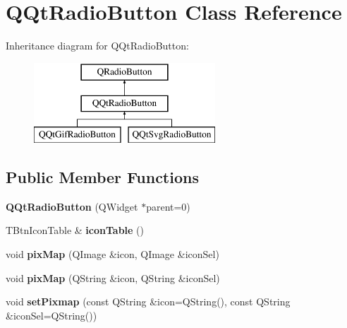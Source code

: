 \hypertarget{class_q_qt_radio_button}{}\section{Q\+Qt\+Radio\+Button Class Reference}
\label{class_q_qt_radio_button}
Inheritance diagram for Q\+Qt\+Radio\+Button\+:\begin{figure}[H]
\begin{center}
\leavevmode
\includegraphics[height=3.000000cm]{class_q_qt_radio_button}
\end{center}
\end{figure}
\subsection*{Public Member Functions}
\begin{DoxyCompactItemize}
\item 
\mbox{\label{class_q_qt_radio_button_aa656d8297746a66e5c9942bbc369e285}} 
{\bfseries Q\+Qt\+Radio\+Button} (Q\+Widget $\ast$parent=0)
\item 
\mbox{\label{class_q_qt_radio_button_a885f79d5f1429412b074f0343898dc1d}} 
T\+Btn\+Icon\+Table \& {\bfseries icon\+Table} ()
\item 
\mbox{\label{class_q_qt_radio_button_a74488bf8d69a60fb5920efe4e15f72a9}} 
void {\bfseries pix\+Map} (Q\+Image \&icon, Q\+Image \&icon\+Sel)
\item 
\mbox{\label{class_q_qt_radio_button_a6343249578ed3c8cddcbdd9edb0fdd43}} 
void {\bfseries pix\+Map} (Q\+String \&icon, Q\+String \&icon\+Sel)
\item 
\mbox{\label{class_q_qt_radio_button_af88b16cb80142a4ad1c19e13a98ac996}} 
void {\bfseries set\+Pixmap} (const Q\+String \&icon=Q\+String(), const Q\+String \&icon\+Sel=Q\+String())
\end{DoxyCompactItemize}
